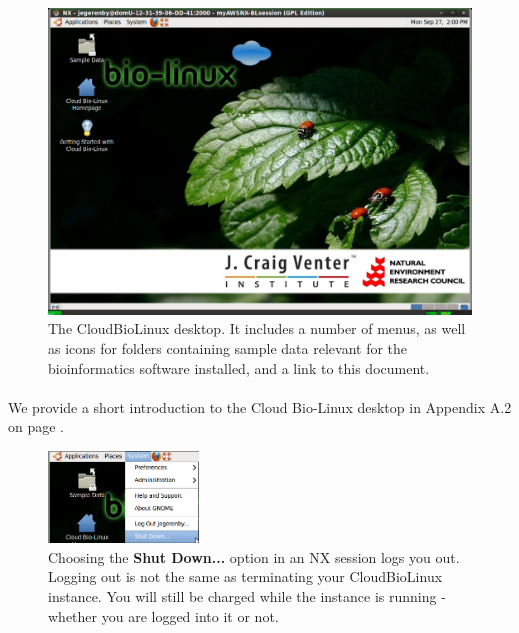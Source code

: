 \begin{figure}[!hd]
	\fbox
	{
		\begin{minipage}{13cm}
\includegraphics[width=\maxwidth]{"images/initalNXdesktop"}
\caption[CloudBL desktop]{\label{fig:bldesktop}The CloudBioLinux desktop. It includes a number of menus, as well as icons for folders containing sample data relevant for the bioinformatics software installed, and a link to this document.}
		\end{minipage}
	}
\end{figure}

\paragraph{}We provide a short introduction to the Cloud Bio-Linux desktop in Appendix A.2 on page \label{section:cloudblDesktop}. 

\begin{figure}
\includegraphics[width=40mm]{"images/nxshutdown"}
\caption[Logging out of NX]{\label{fig:nxshutdown}Choosing the \textbf{Shut Down...} option in an NX session logs you out. Logging out is not the same as terminating your CloudBioLinux instance. You will still be charged while the instance is running - whether you are logged into it or not.}
\end{figure}

